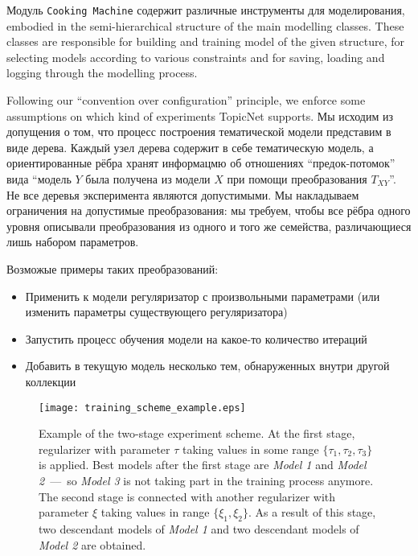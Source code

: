 

Модуль \texttt{Cooking Machine} содержит различные инструменты для моделирования, 
embodied in the semi-hierarchical structure of the main modelling classes. 
These classes are responsible for building and training model of the given structure, for selecting models according to various constraints and for saving, loading and logging through the modelling process.

Following our ``convention over configuration'' principle, we enforce some assumptions on which kind of experiments TopicNet supports. 
Мы исходим из допущения о том, что процесс построения тематической модели представим в виде дерева. Каждый узел дерева содержит в себе тематическую модель, а ориентированные рёбра хранят информацмю об отношениях ``предок-потомок'' вида ``модель $Y$ была получена из модели $X$ при помощи преобразования $T_{XY}$''. Не все деревья эксперимента являются допустимыми. Мы накладываем ограничения на допустимые преобразования: мы требуем, чтобы все рёбра одного уровня описывали преобразования из одного и того же семейства, различающиеся лишь набором параметров. 

\newpage 
Возможые примеры таких преобразований:

\begin{itemize}
    \item Применить к модели регуляризатор с произвольными параметрами (или изменить параметры существующего регуляризатора)
    \item Запустить процесс обучения модели на какое-то количество итераций
    \item Добавить в текущую модель несколько тем, обнаруженных внутри другой коллекции
\end{itemize}

\begin{figure}[t]
    \centering
    \texttt{[image: training\_scheme\_example.eps]}
    \caption{
        Example of the two-stage experiment scheme.
        At the first stage, regularizer with parameter $\tau$ taking values in some range $\{\tau_1, \tau_2, \tau_3\}$ is applied.
        Best models after the first stage are \emph{Model 1} and \emph{Model 2}~---~so \emph{Model 3} is not taking part in the training process anymore.
        The second stage is connected with another regularizer with parameter $\xi$ taking values in range $\{\xi_1, \xi_2\}$.
        As a result of this stage, two descendant models of \emph{Model 1} and two descendant models of \emph{Model 2} are obtained.
    }
\label{Training-scheme}
\end{figure}

